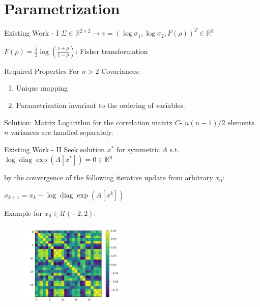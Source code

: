 \documentclass[usenames,dvipsnames]{beamer}
\theoremstyle{definition}
\let\oldcite=\cite
\renewcommand{\cite}[2][]{\textcolor{green}{\oldcite[#1]{#2}}}
\begin{document}
\section{Parametrization}
\begin{frame}{Existing Work - I}
    \cite{archakov2020}
    $\Sigma \in \mathbb{R}^{2 \times 2} \rightarrow v=(\log \sigma_1, \log \sigma_2, F(\rho))^T \in \mathbb{R}^3$
    
    $F(\rho) = \frac{1}{2}\log\left(\frac{1 + \rho}{1 - \rho}\right)$: Fisher transformation

    Required Properties For $n > 2$ Covariances:
    \begin{enumerate}
        \item Unique mapping
        
        \item Parametrization invariant to the ordering of variables.
    \end{enumerate}

    Solution: Matrix Logarithm for the correlation matrix $C$- $n(n-1)/2$ elements. $n$ variances are handled separately.

\end{frame}

\begin{frame}{Existing Work - II}
    Seek solution $x^{\ast}$ for symmetric $A$ s.t.
    $\log \operatorname{diag} \exp(A[x^{\ast}]) = 0 \in \mathbb{R}^n$

    by the convergence of the following iterative update from arbitrary $x_{0}$:

    $x_{k+1} = x_{k} - \log \operatorname{diag} \exp(A[x^{k}])$

    Example for $x_{0} \in \mathcal{U}(-2, 2)$:
    \begin{figure}
        \centering
        \includegraphics[width=0.45\textwidth]{fig/corr_log_transforms.png}
        \label{fig:corr_inversion}
    \end{figure}


\end{frame}
\end{document}
